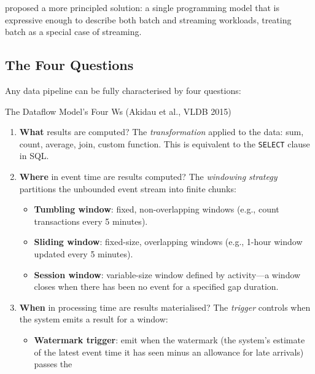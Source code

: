 \autocite{Dataflow2015} proposed a more principled solution: a single
programming model that is expressive enough to describe both batch and
streaming workloads, treating batch as a special case of streaming.

\subsection{The Four Questions}
\label{subsec:four-questions}

Any data pipeline can be fully characterised by four questions:

\begin{defbox}{The Dataflow Model's Four Ws (Akidau et al., VLDB 2015)}
\begin{enumerate}
  \item \textbf{What} results are computed?
        The \emph{transformation} applied to the data: sum, count,
        average, join, custom function. This is equivalent to the
        \texttt{SELECT} clause in SQL.
  \item \textbf{Where} in event time are results computed?
        The \emph{windowing strategy} partitions the unbounded event
        stream into finite chunks:
        \begin{itemize}
          \item \textbf{Tumbling window}: fixed, non-overlapping windows
                (e.g., count transactions every 5 minutes).
          \item \textbf{Sliding window}: fixed-size, overlapping windows
                (e.g., 1-hour window updated every 5 minutes).
          \item \textbf{Session window}: variable-size window defined by
                activity---a window closes when there has been no event
                for a specified gap duration.
        \end{itemize}
  \item \textbf{When} in processing time are results materialised?
        The \emph{trigger} controls when the system emits a result for
        a window:
        \begin{itemize}
          \item \textbf{Watermark trigger}: emit when the watermark
                (the system's estimate of the latest event time it has
                seen minus an allowance for late arrivals) passes the

\end{itemize}
\end{enumerate}
\end{defbox}

